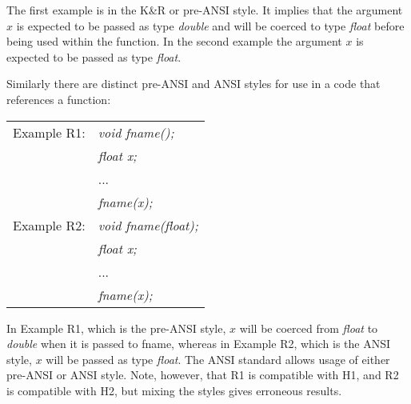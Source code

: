 \documentclass[twoside]{MATH77}
\begin{document}
The first example is in the K\&R or pre-ANSI style.  It implies that
the argument $x$ is expected to be passed as type {\em double} and will be
coerced to type {\em float} before being used within the function.  In the
second example the argument $x$ is expected to be passed as type {\em float}.

Similarly there are distinct pre-ANSI and ANSI styles for use in a code
that references a function:

\begin{tabular}{l@{\ }l}
\hspace{-5pt}Example R1: & {\em void fname();}\\
&  {\em float x;}\\
&  ...\\
&  {\em fname(x);}\\
\vspace{5pt}
\hspace{-5pt}Example R2: & {\em void fname(float);}\\
&  {\em float x;}\\
&  ...\\
&  {\em fname(x);}
\end{tabular}

In Example R1, which is the pre-ANSI style, $x$ will be coerced from
{\em float} to {\em double} when it is passed to fname,
whereas in Example R2, which is the ANSI style, $x$ will be passed as
type {\em float}.  The ANSI standard allows usage of either pre-ANSI
or ANSI style.  Note, however, that R1 is compatible with H1, and R2
is compatible with H2, but mixing the styles gives erroneous results.
\end{document}
